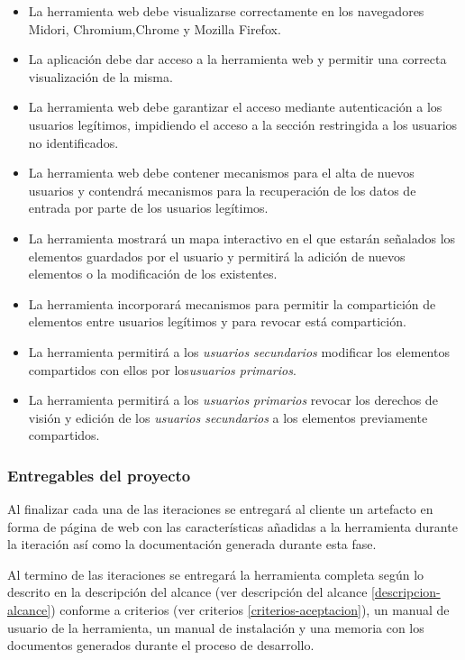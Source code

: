 		\begin{itemize}[label={$\bullet$},labelindent=\parindent,leftmargin=2cm]
			\item La herramienta web debe visualizarse correctamente en los navegadores Midori, Chromium,Chrome y Mozilla Firefox.
			\item La aplicación debe dar acceso a la herramienta web y permitir una correcta visualización de la misma.
			\item La herramienta web debe garantizar el acceso mediante autenticación a los usuarios legítimos, impidiendo el acceso a la sección restringida a los usuarios no identificados.
			\item La herramienta web debe contener mecanismos para el alta de nuevos usuarios y contendrá mecanismos para la recuperación de los datos de entrada por parte de los usuarios legítimos.
			\item La herramienta mostrará un mapa interactivo en el que estarán señalados los elementos guardados por el usuario y permitirá la adición de nuevos elementos o la modificación de los existentes.
			\item La herramienta incorporará mecanismos para permitir la compartición de elementos entre usuarios legítimos y para revocar está compartición.
			\item La herramienta permitirá a los \textit{usuarios secundarios} modificar los elementos compartidos con ellos por los\textit{usuarios primarios}.
			\item La herramienta permitirá a los \textit{usuarios primarios} revocar los derechos de visión y edición de los \textit{usuarios secundarios} a los elementos previamente compartidos.
		\end{itemize}

		\subsubsection{Entregables del proyecto}
		Al finalizar cada una de las iteraciones se entregará al cliente un artefacto en forma de página de web con las características añadidas a la herramienta durante la iteración así como la documentación generada durante esta fase.
		
	Al termino de las iteraciones se entregará la herramienta completa según lo descrito en la descripción del alcance (ver descripción del alcance \ref{descripcion-alcance}) conforme a criterios (ver criterios \ref{criterios-aceptacion}), un manual de usuario de la herramienta, un manual de instalación y una memoria con los documentos generados durante el proceso de desarrollo.
	
